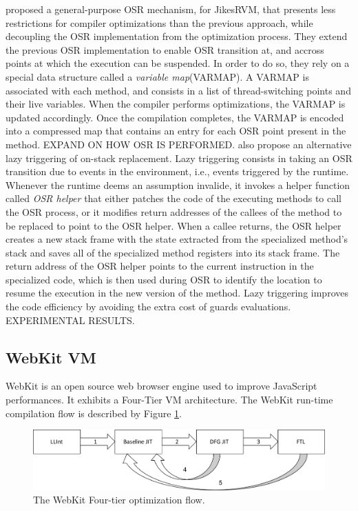  proposed a general-purpose OSR mechanism, for JikesRVM, that presents less restrictions for compiler optimizations than the previous approach, while decoupling the OSR implementation from the optimization process.
They extend the previous OSR implementation\cite{fink2003design} to enable OSR transition at, and accross points at which the execution can be suspended.
In order to do so, they rely on a special data structure called a \textit{variable map}(VARMAP).
A VARMAP is associated with each method, and consists in a list of thread-switching points and their live variables.
When the compiler performs optimizations, the VARMAP is updated accordingly.
Once the compilation completes, the VARMAP is encoded into a compressed map that contains an entry for each OSR point present in the method. EXPAND ON HOW OSR IS PERFORMED.
 also propose an alternative lazy triggering of on-stack replacement.
Lazy triggering consists in taking an OSR transition due to events in the environment, i.e., events triggered by the runtime. 
Whenever the runtime deems an assumption invalide, it invokes a helper function called \textit{OSR helper} that either patches the code of the executing methods to call the OSR process, or it modifies return addresses of the callees of the method to be replaced to point to the OSR helper.
When a callee returns, the OSR helper creates a new stack frame with the state extracted from the specialized method's stack and saves all of the specialized method registers into its stack frame. 
The return address of the OSR helper points to the current instruction in the specialized code, which is then used during OSR to identify the location to resume the execution in the new version of the method.
Lazy triggering improves the code efficiency by avoiding the extra cost of guards evaluations.\\

EXPERIMENTAL RESULTS.

\subsection{WebKit VM}\label{webkit}

WebKit is an open source web browser engine used to improve JavaScript performances.
It exhibits a Four-Tier VM architecture. 
The WebKit run-time compilation flow is described by Figure \ref{FTL}.\\
\begin{figure}[h]
\centering
\includegraphics[scale=0.5]{Figures/FTL}
\decoRule
\caption[The WebKit FTL]{The WebKit Four-tier optimization flow.}
\label{FTL}
\end{figure}
 
